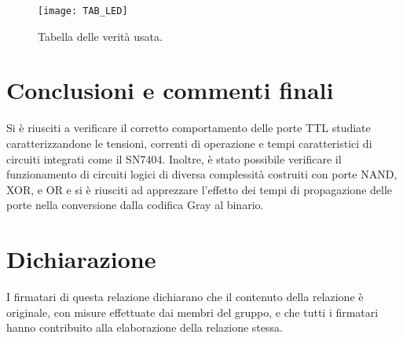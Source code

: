 \documentclass[10pt, a4paper, italian]{article}
\begin{document}
\begin{figure}[htbp]
    \centering
    \texttt{[image: TAB\_LED]}
    \caption{Tabella delle verità usata.}
    \label{fig: Ver}
\end{figure}

\section*{Conclusioni e commenti finali}
Si è riusciti a verificare il corretto comportamento delle porte TTL studiate
caratterizzandone le tensioni, correnti di operazione e tempi caratteristici
di circuiti integrati come il SN7404.
Inoltre, è stato possibile verificare il funzionamento di circuiti logici di
diversa complessità costruiti con porte NAND, XOR, e OR e si è riusciti ad
apprezzare l'effetto dei tempi di propagazione delle porte nella conversione
dalla codifica Gray al binario.

\section*{Dichiarazione}
I firmatari di questa relazione dichiarano che il contenuto della relazione \`e
originale, con misure effettuate dai membri del gruppo, e che tutti i firmatari
hanno contribuito alla elaborazione della relazione stessa.
\end{document}
